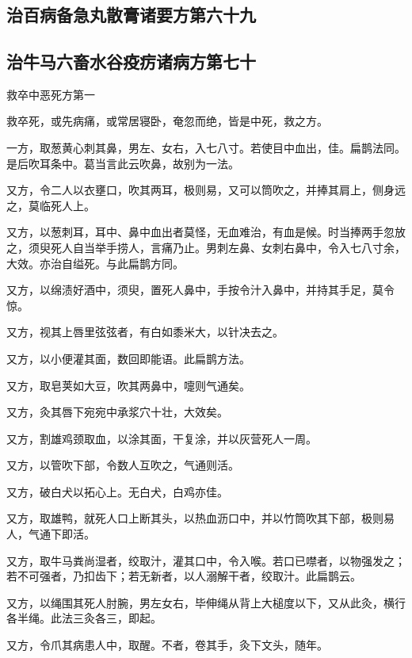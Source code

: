 \documentclass[12pt,UTF8]{ctexbook}
\begin{document}
\part{}

\chapter{治百病备急丸散膏诸要方第六十九}
\chapter{治牛马六畜水谷疫疠诸病方第七十}



救卒中恶死方第一

救卒死，或先病痛，或常居寝卧，奄忽而绝，皆是中死，救之方。

一方，取葱黄心刺其鼻，男左、女右，入七八寸。若使目中血出，佳。扁鹊法同。是后吹耳条中。葛当言此云吹鼻，故别为一法。

又方，令二人以衣壅口，吹其两耳，极则易，又可以筒吹之，并捧其肩上，侧身远之，莫临死人上。

又方，以葱刺耳，耳中、鼻中血出者莫怪，无血难治，有血是候。时当捧两手忽放之，须臾死人自当举手捞人，言痛乃止。男刺左鼻、女刺右鼻中，令入七八寸余，大效。亦治自缢死。与此扁鹊方同。

又方，以绵渍好酒中，须臾，置死人鼻中，手按令汁入鼻中，并持其手足，莫令惊。

又方，视其上唇里弦弦者，有白如黍米大，以针决去之。

又方，以小便灌其面，数回即能语。此扁鹊方法。

又方，取皂荚如大豆，吹其两鼻中，嚏则气通矣。

又方，灸其唇下宛宛中承浆穴十壮，大效矣。

又方，割雄鸡颈取血，以涂其面，干复涂，并以灰营死人一周。

又方，以管吹下部，令数人互吹之，气通则活。

又方，破白犬以拓心上。无白犬，白鸡亦佳。

又方，取雄鸭，就死人口上断其头，以热血沥口中，并以竹筒吹其下部，极则易人，气通下即活。

又方，取牛马粪尚湿者，绞取汁，灌其口中，令入喉。若口已噤者，以物强发之；若不可强者，乃扣齿下；若无新者，以人溺解干者，绞取汁。此扁鹊云。

又方，以绳围其死人肘腕，男左女右，毕伸绳从背上大槌度以下，又从此灸，横行各半绳。此法三灸各三，即起。

又方，令爪其病患人中，取醒。不者，卷其手，灸下文头，随年。
\end{document}
